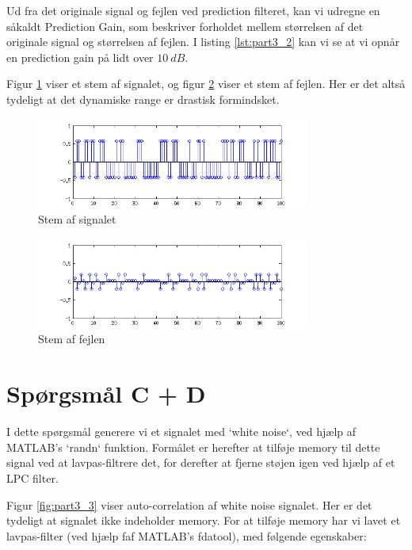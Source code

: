 Ud fra det originale signal og fejlen ved prediction filteret, kan vi udregne en såkaldt Prediction Gain, som beskriver forholdet mellem størrelsen af det originale signal og størrelsen af fejlen. I listing \ref{lst:part3_2} kan vi se at vi opnår en prediction gain på lidt over $10\ dB$.

Figur \ref{fig:part3_1} viser et stem af signalet, og figur \ref{fig:part3_2} viser et stem af fejlen. Her er det altså tydeligt at det dynamiske range er drastisk formindsket.

\begin{figure}[!ht]
	\centering
	\includegraphics[width=0.8\textwidth]{resources/part3_signal}
 	\caption{Stem af signalet}
 	\label{fig:part3_1}
\end{figure}

\begin{figure}[!ht]
	\centering
	\includegraphics[width=0.8\textwidth]{resources/part3_error}
 	\caption{Stem af fejlen}
 	\label{fig:part3_2}
\end{figure}


\section{Spørgsmål C + D}

I dette spørgsmål generere vi et signalet med `white noise`, ved hjælp af MATLAB's `randn` funktion. Formålet er herefter at tilføje memory til dette signal ved at lavpas-filtrere det, for derefter at fjerne støjen igen ved hjælp af et LPC filter.

Figur \ref{fig:part3_3} viser auto-correlation af white noise signalet. Her er det tydeligt at signalet ikke indeholder memory. For at tilføje memory har vi lavet et lavpas-filter (ved hjælp faf MATLAB's fdatool), med følgende egenskaber: 

